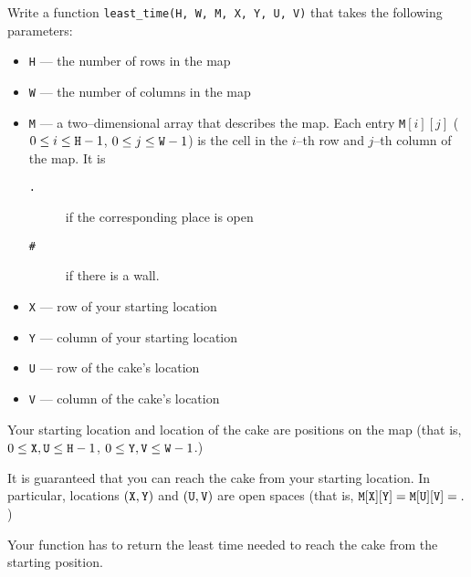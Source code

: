 \documentclass{../../../latex/boi2014}
\newcommand{\param}[1]{{\tt #1}}
\newcommand{\method}[1]{{\tt #1}}
\newcommand{\constant}[1]{{\tt #1}}
\begin{document}
    \Implementation

    Write a function \method{least\_time(H, W, M, X, Y, U, V)} that takes
    the following parameters:
    \begin{itemize}
        \item \param{H} --- the number of rows in the map
        \item \param{W} --- the number of columns in the map
        \item \param{M} --- a two--dimensional array that describes the map.
                            Each entry \param{M}$[i][j]$
                            ($0 \le i \le \param{H}-1$,
                            $0 \le j \le \param{W}-1$) is the cell in
                            the $i$--th row and $j$--th column of the map.
                            It is
                            \begin{description}
                                \item[\constant{.}] if the corresponding
                                    place is open
                                \item[\constant{\#}] if there is a wall.
                            \end{description}
        \item \param{X} --- row of your starting location
        \item \param{Y} --- column of your starting location
        \item \param{U} --- row of the cake's location
        \item \param{V} --- column of the cake's location
    \end{itemize}

    Your starting location and location of the cake are positions
    on the map
    (that is, $0 \le \param{X}, \param{U} \le \param{H}-1$,
    $0 \le \param{Y}, \param{V} \le \param{W}-1$.)

    It is guaranteed that you can reach the cake from your starting
    location. In particular, locations $(\param{X}, \param{Y})$
    and $(\param{U}, \param{V})$ are open spaces (that is, $\param{M}
    [\param{X}][\param{Y}] = \param{M}[\param{U}][\param{V}] =
    \constant{.}$)


    Your function has to return the least time needed to reach the cake
    from the starting position.

    \Example
\end{document}
